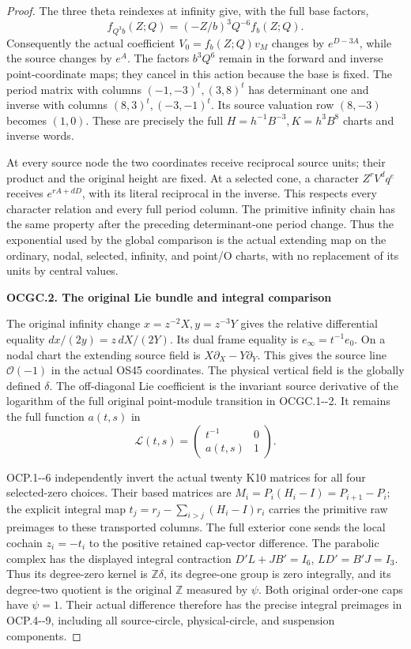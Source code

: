 \begin{proof}
The three theta reindexes at infinity give, with the full base factors,
\[
f_{Q^3b}(Z;Q)=(-Z/b)^3Q^{-6}f_b(Z;Q).
\tag{OCGC.2}
\]
Consequently the actual coefficient \(V_0=f_b(Z;Q)v_M\) changes by
\(e^{D-3A}\), while the source changes by \(e^A\). The factors
\(b^3Q^6\) remain in the forward and inverse point-coordinate maps;
they cancel in this action because the base is fixed. The period
matrix with columns \((-1,-3)^t,(3,8)^t\) has determinant one and
inverse with columns \((8,3)^t,(-3,-1)^t\). Its source valuation
row \((8,-3)\) becomes \((1,0)\). These are precisely the full
\(H=h^{-1}B^{-3},K=h^3B^8\) charts and inverse words.

At every source node the two coordinates receive reciprocal source
units; their product and the original height are fixed. At a selected
cone, a character \(Z^rV^d q^e\) receives \(e^{rA+dD}\), with its
literal reciprocal in the inverse. This respects every character
relation and every full period column. The primitive infinity chain
has the same property after the preceding determinant-one period
change. Thus the exponential used by the global comparison is the
actual extending map on the ordinary, nodal, selected, infinity, and
point/O charts, with no replacement of its units by central values.

\par

\medskip\noindent\textbf{OCGC.2. The original Lie bundle and integral comparison}

\par\nobreak

The original infinity change \(x=z^{-2}X,y=z^{-3}Y\) gives the relative
differential equality \(dx/(2y)=z\,dX/(2Y)\). Its dual frame equality
is \(e_\infty=t^{-1}e_0\). On a nodal chart the extending source
field is \(X\partial_X-Y\partial_Y\). This gives the source line
\(\mathcal O(-1)\) in the actual OS45 coordinates. The physical
vertical field is the globally defined \(\delta\). The off-diagonal
Lie coefficient is the invariant source derivative of the logarithm
of the full original point-module transition in OCGC.1-\/-2. It remains
the full function \(a(t,s)\) in
\[
\mathcal L(t,s)=\begin{pmatrix}t^{-1}&0\\a(t,s)&1\end{pmatrix}.
\tag{OCGC.3}
\]

OCP.1-\/-6 independently invert the actual twenty K10 matrices for all
four selected-zero choices. Their based matrices are
\(M_i=P_i(H_i-I)=P_{i+1}-P_i\); the explicit integral map
\(t_j=r_j-\sum_{i>j}(H_i-I)r_i\) carries the primitive raw preimages
to these transported columns. The full exterior cone sends the local
cochain \(z_i=-t_i\) to the positive retained cap-vector difference.
The parabolic complex has the displayed integral contraction
\(D'L+JB'=I_6\), \(LD'=B'J=I_3\). Thus its degree-zero kernel is
\(\mathbb Z\delta\), its degree-one group is zero integrally, and its
degree-two quotient is the original \(\mathbb Z\) measured by \(\psi\).
Both original order-one caps have \(\psi=1\). Their actual difference
therefore has the precise integral preimages in OCP.4-\/-9, including
all source-circle, physical-circle, and suspension components.


\end{proof}
